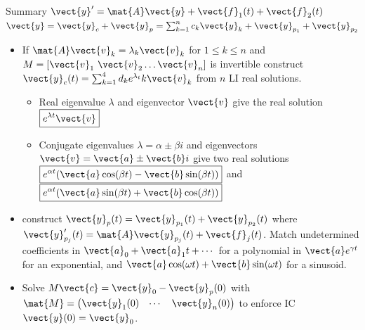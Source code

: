 \begin{frame}{Summary 
		\quad$\vect{y}'=\mat{A}\vect{y}+\vect{f}_1(t)+\vect{f}_2(t)$
		\quad
		$\vect{y}=\vect{y}_c+\vect{y}_p=\sum_{k=1}^{n}c_k\vect{y}_k+\vect{y}_{p_1}+\vect{y}_{p_2}$}
\begin{itemize}
  \item {} If $\mat{A}\vect{v}_k = \lambda_k \vect{v}_k$ for $1\leq k \leq n$  
  and $M=[\vect{v}_1\ \vect{v}_2 \dots  \vect{v}_n]$ is invertible 
  construct
   $\vect{y}_c(t) = \sum_{k=1}^{4}d_k e^{\lambda_t}k 
  \vect{v}_k$ from $n$ LI real solutions.
  \begin{itemize}
  \itemsep=\glueexpr{}/2+3pt\relax
  	\item Real eigenvalue $\lambda$ and eigenvector $\vect{v}$ give 
  	the real solution $\boxed{e^{\lambda t}\vect{v}}$
  \item Conjugate eigenvalues
  $\lambda = \alpha \pm \beta i$ and
  eigenvectors 
  $\vect{v} = \vect{a} \pm \vect{b} i$
  give two real solutions 
  $\boxed{e^{\alpha t}(\vect{a}\cos(\beta t)-\vect{b}\sin(\beta t))}$ and
  $\boxed{e^{\alpha t}(\vect{a}\sin(\beta t)+\vect{b}\cos(\beta t))}$
  \end{itemize}
  \item {} construct
  $\vect{y}_p(t) = \vect{y}_{p_1}(t)+\vect{y}_{p_2}(t)$ where $\vect{y}_{p_j}'(t)=\mat{A}\vect{y}_{p_j}(t)+\vect{f}_j(t)$.
  Match undetermined coefficients in $\vect{a}_0+\vect{a}_1t+\cdots$ 
  for a polynomial in $\vect{a} e^{\gamma t}$ for an exponential, 
  and $\vect{a}\cos(\omega t)+\vect{b}\sin(\omega t)$ for a sinusoid.
  \item {} Solve 
  $M \vect{c} =\vect{y}_0-\vect{y}_p(0)$ with
  $\mat{M}=\begin{pmatrix}\vect{y}_1(0)&\cdots&\vect{y}_n(0)\end{pmatrix}$ to enforce IC $\vect{y}(0)=\vect{y}_0$.
\end{itemize}
\end{frame}
